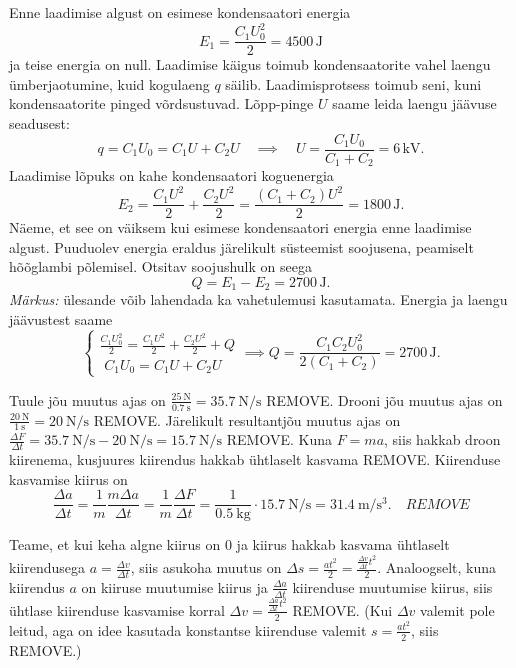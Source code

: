 \documentclass[10pt]{article}
\newcommand{\p}[1]{REMOVE}
\begin{document}
\solu
Enne laadimise algust on esimese kondensaatori energia
\[E_1=\frac{C_1U_0^2}{2}=4500\,\textrm{J}\]
ja teise energia on null. Laadimise käigus toimub kondensaatorite vahel laengu ümberjaotumine, kuid kogulaeng $q$ säilib. Laadimisprotsess toimub seni, kuni kondensaatorite pinged võrdsustuvad. Lõpp-pinge $U$ saame leida laengu jäävuse seadusest:
\[q=C_1U_0=C_1U+C_2U\quad\implies\quad U=\frac{C_1U_0}{C_1+C_2}=6\,\textrm{kV}.\]
Laadimise lõpuks on kahe kondensaatori koguenergia
\[E_2=\frac{C_1U^2}{2}+\frac{C_2U^2}{2}=\frac{(C_1+C_2)U^2}{2}=1800\,\textrm{J}.\]
Näeme, et see on väiksem kui esimese kondensaatori energia enne laadimise algust. Puuduolev energia eraldus järelikult süsteemist soojusena, peamiselt hõõglambi põlemisel. Otsitav soojushulk on seega
\[Q=E_1-E_2=2700\,\textrm{J}.\]
\emph{Märkus:} ülesande võib lahendada ka vahetulemusi kasutamata. Energia ja laengu jäävustest saame
\[
\begin{cases}
\displaystyle\frac{C_1U_0^2}{2}=\frac{C_1U^2}{2}+\frac{C_2U^2}{2}+Q\\
\,\,C_1U_0=C_1U+C_2U
\end{cases}
\implies Q=\frac{C_1C_2U_0^2}{2(C_1+C_2)}=2700\,\textrm{J}.
\]
\probend
\bigskip


\solu
Tuule jõu muutus ajas on $\frac{\SI{25}{\N}}{\SI{0.7}{\s}} = \SI{35.7}{\N\per\s}$ \p{0,5}. Drooni jõu muutus ajas on $\frac{\SI{20}{\N}}{\SI{1}{\s}} = \SI{20}{\N\per\s}$ \p{0,5}. Järelikult resultantjõu muutus ajas on $\frac{\Delta F}{\Delta t} = \SI{35.7}{\N\per\s}-\SI{20}{\N\per\s}=\SI{15.7}{\N\per\s}$ \p{1}. Kuna $F=ma$, siis hakkab droon kiirenema, kusjuures kiirendus hakkab ühtlaselt kasvama \p{1}. Kiirenduse kasvamise kiirus on
\begin{equation*}
    \frac{\Delta a}{\Delta t} = \frac{1}{m}\frac{m\Delta a}{\Delta t} = \frac{1}{m}\frac{\Delta F}{\Delta t} = \frac{1}{\SI{0.5}{\kg}}\cdot \SI{15.7}{\N\per\s} = \SI{31.4}{\m\per\s\cubed}. \quad \p{1}
\end{equation*}

Teame, et kui keha algne kiirus on 0 ja kiirus hakkab kasvama ühtlaselt kiirendusega $a = \frac{\Delta v}{\Delta t}$, siis asukoha muutus on $\Delta s = \frac{at^2}{2} = \frac{\frac{\Delta v}{\Delta t}t^2}{2}$. Analoogselt, kuna kiirendus $a$ on kiiruse muutumise kiirus ja $\frac{\Delta a}{\Delta t}$ kiirenduse muutumise kiirus, siis ühtlase kiirenduse kasvamise korral $\Delta v = \frac{\frac{\Delta a}{\Delta t}t^2}{2}$ \p{3}. (Kui $\Delta v$ valemit pole leitud, aga on idee kasutada konstantse kiirenduse valemit $s = \frac{at^2}{2}$, siis \p{1}.)
\end{document}
